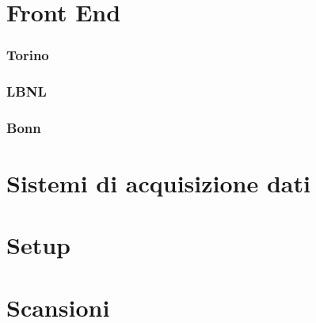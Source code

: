 \section{Front End}
\subsubsection{Torino}
\subsubsection{LBNL}
\subsubsection{Bonn}
\section{Sistemi di acquisizione dati}
\section{Setup}

%
\section{Scansioni}
